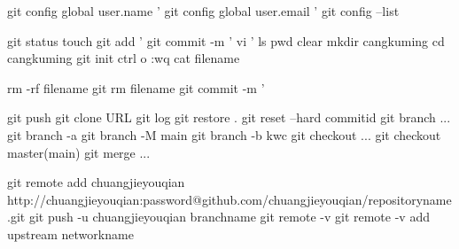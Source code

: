 git config global user.name '%
git config global user.email '%
git config --list %

git status
touch %
git add '%
git commit -m '%
vi '%
ls %
pwd %
clear
mkdir cangkuming  %
cd cangkuming %
git init %
ctrl o %
:wq   %
cat filename %

rm -rf filename
git rm filename
git commit -m '%

git push %
git clone URL
git log %
git restore . %
git reset --hard commitid %
git branch ... %
git branch -a %
git branch -M main %
git branch -b kwc %
git checkout ...%
git checkout master(main) %
git merge ... %

git remote add chuangjieyouqian http://chuangjieyouqian:password@github.com/chuangjieyouqian/repositoryname.git
git push -u chuangjieyouqian branchname %
git remote -v %
git remote -v add upstream networkname 
